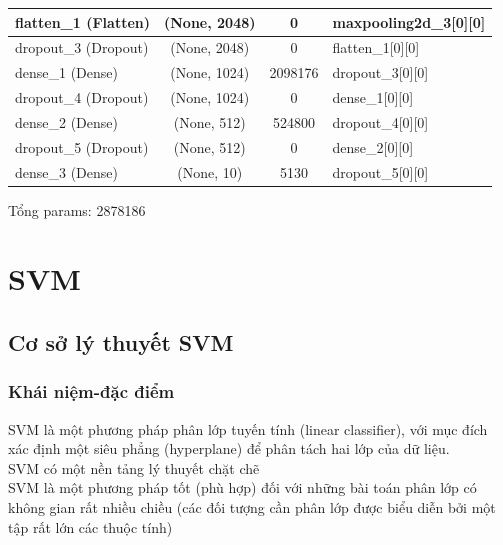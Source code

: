 \documentclass[a4paper,12pt]{report}
\begin{document}
{\begin{center}
\begin{longtable}{lccl}
\hline
flatten\_1 (Flatten)        &      (None, 2048) &         0    &       maxpooling2d\_3[0][0]    \\        

\hline
dropout\_3 (Dropout)    &          (None, 2048)  &        0   &        flatten\_1[0][0]    \\              

\hline
dense\_1 (Dense)      &            (None, 1024)     &     2098176   &  dropout\_3[0][0]    \\              

\hline
dropout\_4 (Dropout)  &            (None, 1024)  &        0  &         dense\_1[0][0]      \\              
\hline
dense\_2 (Dense)       &           (None, 512)  &         524800&      dropout\_4[0][0]        \\          

\hline
dropout\_5 (Dropout)    &          (None, 512) &          0      &     dense\_2[0][0]        \\           

\hline
dense\_3 (Dense)         &         (None, 10) &           5130    &    dropout\_5[0][0]          \\        

\hline
\end{longtable} 
\end{center}
}
Tổng params: 2878186
\section{SVM}
\subsection{Cơ sở lý thuyết SVM}
\subsubsection{Khái niệm-đặc điểm  }
SVM là một phương pháp phân lớp tuyến tính (linear
classifier), với mục đích xác định một siêu phẳng
(hyperplane) để phân tách hai lớp của dữ liệu.\\
SVM có một nền tảng lý thuyết chặt chẽ\\
SVM là một phương pháp tốt (phù hợp) đối với những bài
toán phân lớp có không gian rất nhiều chiều (các đối
tượng cần phân lớp được biểu diễn bởi một tập rất lớn
các thuộc tính)\\
\end{document}

